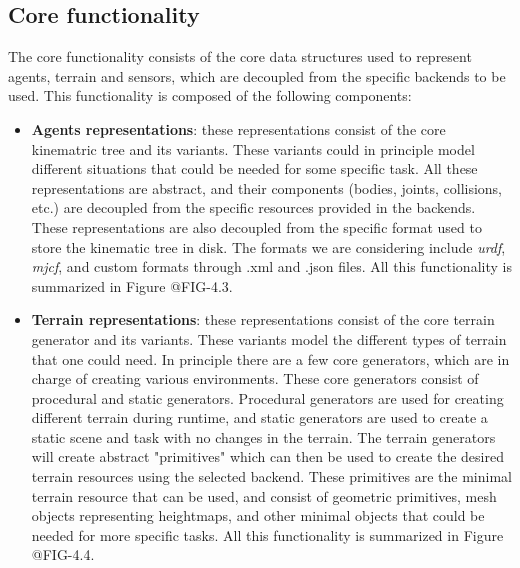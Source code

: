 \subsection{Core functionality}

The core functionality consists of the core data structures used to represent agents,
terrain and sensors, which are decoupled from the specific backends to be used. This functionality
is composed of the following components:

\begin{itemize}
    \item \textbf{Agents representations}: these representations consist of the core kinematric tree and its
          variants. These variants could in principle model different situations that could be needed
          for some specific task. All these representations are abstract, and their components (bodies, 
          joints, collisions, etc.) are decoupled from the specific resources provided in the backends.
          These representations are also decoupled from the specific format used to store the kinematic
          tree in disk. The formats we are considering include \textit{urdf}, \textit{mjcf}, and custom
          formats through .xml and .json files. All this functionality is summarized in Figure @FIG-4.3.

        \figFrameworkCoreAgent

    \item \textbf{Terrain representations}: these representations consist of the core terrain generator and its
          variants. These variants model the different types of terrain that one could need. In principle
          there are a few core generators, which are in charge of creating various environments. These core
          generators consist of procedural and static generators. Procedural generators are used for creating
          different terrain during runtime, and static generators are used to create a static scene and task
          with no changes in the terrain. The terrain generators will create abstract "primitives" which can then
          be used to create the desired terrain resources using the selected backend. These primitives are the minimal
          terrain resource that can be used, and consist of geometric primitives, mesh objects representing heightmaps,
          and other minimal objects that could be needed for more specific tasks. All this functionality is
          summarized in Figure @FIG-4.4.

        \figFrameworkCoreTerrain


\end{itemize}
